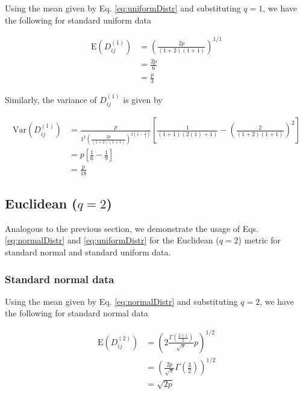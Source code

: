 \documentclass[10pt,letterpaper]{article}\usepackage[]{graphicx}\usepackage[]{color}
\begin{document}
Using the mean given by Eq. \ref{eq:uniformDistr} and substituting $q=1$, we have the following for standard uniform data

\begin{equation}\label{eq:uniformManMean}
\begin{aligned}
\text{E}\left(D^{(1)}_{ij}\right) &= \left(\frac{2p}{(1+2)(1+1)}\right)^{1/1} \\
&= \frac{2p}{6} \\
&= \frac{p}{3}
\end{aligned}
\end{equation}

Similarly, the variance of $D^{(1)}_{ij}$ is given by

\begin{equation}\label{eq:uniformManVar}
\begin{aligned}
\text{Var}\left(D^{(1)}_{ij}\right) &= \frac{p}{1^2\left(\frac{2p}{(1 + 2)(1 + 1)}\right)^{2\left(1 - \frac{1}{1}\right)}}\left[\frac{1}{(1 + 1)(2(1) + 1)} - \left(\frac{2}{(1 + 2)(1 + 1)}\right)^2\right] \\
&= p\left[\frac{1}{6} - \frac{1}{9}\right] \\
&= \frac{p}{18}
\end{aligned}
\end{equation}

\subsection{Euclidean \texorpdfstring{($q=2$)}{}}

Analogous to the previous section, we demonstrate the usage of Eqs. \ref{eq:normalDistr} and \ref{eq:uniformDistr} for the Euclidean ($q=2$) metric for standard normal and standard uniform data.

\subsubsection{Standard normal data}

Using the mean given by Eq. \ref{eq:normalDistr} and substituting $q=2$, we have the following for standard normal data

\begin{equation}\label{eq:normalEucMean}
\begin{aligned}
\text{E}\left(D^{(2)}_{ij}\right) &= \left(2\frac{\Gamma\left(\frac{2 + 1}{2}\right)}{\sqrt{\pi}}p\right)^{1/2} \\
&= \left(\frac{2p}{\sqrt{\pi}}\Gamma\left(\frac{3}{2}\right)\right)^{1/2} \\
&= \sqrt{2p}
\end{aligned}
\end{equation}
\end{document}
